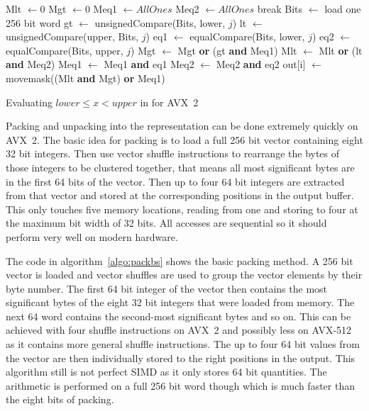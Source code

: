 \begin{algorithm}[h]
\begin{algorithmic}[1]
    \State Mlt $\gets 0$
    \State Mgt $\gets 0$
    \State Meq1 $\gets AllOnes$
    \State Meq2 $\gets AllOnes$
        \State break 
      \EndIf
      \State Bits $\gets$ load one 256 bit word
      \State gt $\gets$ unsignedCompare(Bits, lower, $j$)
      \State lt $\gets$ unsignedCompare(upper, Bits, $j$)
      \State eq1 $\gets$ equalCompare(Bits, lower, $j$)
      \State eq2 $\gets$ equalCompare(Bits, upper, $j$)
      \State Mgt $\gets$ Mgt \textbf{or} (gt \textbf{and} Meq1)
      \State Mlt $\gets$ Mlt \textbf{or} (lt \textbf{and} Meq2)
      \State Meq1 $\gets$ Meq1 \textbf{and} eq1
      \State Meq2 $\gets$ Meq2 \textbf{and} eq2
    \EndFor
    \State out[i] $\gets$ movemask((Mlt \textbf{and} Mgt) \textbf{or} Meq1)
  \EndFor
  \EndProcedure
\end{algorithmic}
\caption{Evaluating $lower \le x < upper$ in \bs{} for AVX~2}
\label{algo:byteslicescan}
\end{algorithm}

Packing and unpacking into the \bs{} representation can be done extremely
quickly on AVX~2. The basic idea for packing is to load a full 256 bit vector
containing eight 32 bit integers. Then use vector shuffle instructions to
rearrange the bytes of those integers to be clustered together, that means all
most significant bytes are in the first 64 bits of the vector. Then up to four
64 bit integers are extracted from that vector and stored at the corresponding
positions in the output buffer. This only touches five memory locations, reading
from one and storing to four at the maximum bit width of 32 bits. All accesses
are sequential so it should perform very well on modern hardware.

The code in algorithm~\ref{algo:packbs} shows the basic packing method. A 256
bit vector is loaded and vector shuffles are used to group the vector elements
by their byte number. The first 64 bit integer of the vector then contains the
most significant bytes of the eight 32 bit integers that were loaded from
memory. The next 64 word contains the second-most significant bytes and so on.
This can be achieved with four shuffle instructions on AVX~2 and possibly less
on AVX-512 as it contains more general shuffle instructions. The up to four 64
bit values from the vector are then individually stored to the right positions
in the output. This algorithm still is not perfect SIMD as it only stores 64 bit
quantities. The arithmetic is performed on a full 256 bit word though which is
much faster than the eight bits of \bwv{} packing.

